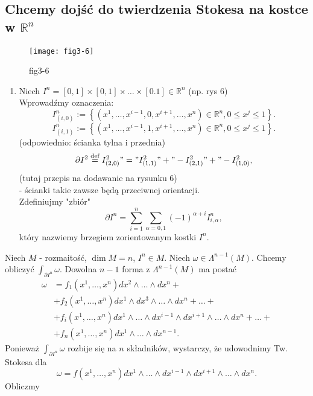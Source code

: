 \documentclass[../main.tex]{subfiles}
\begin{document}
    \subsection{Chcemy dojść do twierdzenia Stokesa na kostce w $\mathbb{R}^n$}
    \begin{figure}[h]
        \centering
        \texttt{[image: fig3-6]}
        \caption{fig3-6}
        \label{fig:fig3-6}
    \end{figure}
    \begin{enumerate}
        \item Niech $I^n = [0,1]\times[0,1]\times\ldots\times[0.1]\in \mathbb{R}^n$ (np. rys 6)\\
Wprowadźmy oznaczenia:
\[
    I^n_{(i,0)} := \left\{ \left( x^1,\ldots,x^{i-1},0,x^{i+1},\ldots,x^n \right) \in \mathbb{R}^n, 0\le x^j\le 1 \right\}
.\]
\[
    I^n_{(i,1)} := \left\{ \left( x^1,\ldots,x^{i-1},1,x^{i+1},\ldots,x^n \right) \in \mathbb{R}^n, 0\le x^j\le 1 \right\}
.\]
(odpowiednio: ścianka tylna i przednia)
\[
    \partial I^2 \overset{\text{def}}{=} I^2_{(2,0)} "=" I^2_{(1,1)} "+" - I^2_{(2,1)} "+" - I^2_{(1,0)}
,\]
(tutaj przepis na dodawanie na rysunku 6)\\
- ścianki takie zawsze będą przeciwnej orientacji.\\
Zdefiniujmy "zbiór"
\[
    \partial I^n = \sum_{i = 1}^n \sum_{\alpha = 0,1} (-1)^{\alpha + i}I^n_{i,\alpha}
,\]
który nazwiemy brzegiem zorientowanym kostki $I^n$.
    \end{enumerate}
        Niech $M$ - rozmaitość, $\dim M = n$, $I^n \in M$. Niech $\omega\in \Lambda^{n-1}(M)$. Chcemy obliczyć $\int_{\partial I^n}\omega$. Dowolna $n-1$ forma z $\Lambda^{n-1}(M)$ ma postać
        \begin{align*}
            \omega &= f_1(x^1,\ldots,x^n)dx^2\land\ldots\land dx^n +\\
            &+f_2(x^1,\ldots,x^n)dx^1\land dx^3\land\ldots\land dx^n + \ldots +\\
            &+ f_i(x^1,\ldots,x^n)dx^1\land\ldots\land dx^{i-1}\land dx^{i+1}\land \ldots\land dx^n + \ldots +\\
            &+ f_n(x^1,\ldots,x^n)dx^1\land\ldots\land dx^{n-1}
        .\end{align*}
        Ponieważ $\int_{\partial I^n}\omega$ rozbije się na $n$ składników, wystarczy, że udowodnimy Tw. Stokesa dla
        \[
            \omega = f(x^1,\ldots,x^n)dx^1\land \ldots\land dx^{i-1}\land dx^{i+1}\land \ldots \land dx^n
        .\]
    Obliczmy
\end{document}
